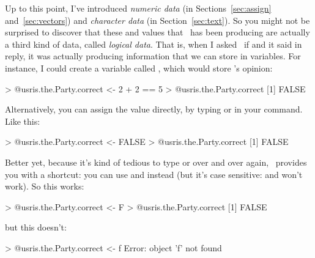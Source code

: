 Up to this point, I've introduced {\it numeric data} (in Sections~\ref{sec:assign} and~\ref{sec:vectors}) and {\it character data} (in Section~\ref{sec:text}). So you might not be surprised to discover that these  and  values that \R\ has been producing are actually a third kind of data, called {\it logical data}. That is, when I asked \R\ if  and it said  in reply, it was actually producing information that we can store in variables. For instance, I could create a variable called , which would store \R's opinion:
\begin{rblock1}
> @usr{is.the.Party.correct <- 2 + 2 == 5}
> @usr{is.the.Party.correct}
[1] FALSE
\end{rblock1}
Alternatively, you can assign the value directly, by typing  or  in your command. Like this:
\begin{rblock1}
> @usr{is.the.Party.correct <- FALSE}
> @usr{is.the.Party.correct}
[1] FALSE
\end{rblock1}
Better yet, because it's kind of tedious to type  or  over and over again, \R\ provides you with a shortcut: you can use  and  instead (but it's case sensitive:  and  won't work). So this works:
\begin{rblock1}
> @usr{is.the.Party.correct <- F}
> @usr{is.the.Party.correct}
[1] FALSE
\end{rblock1}
but this doesn't:
\begin{rblock1}
> @usr{is.the.Party.correct <- f}
Error: object 'f' not found
\end{rblock1}


